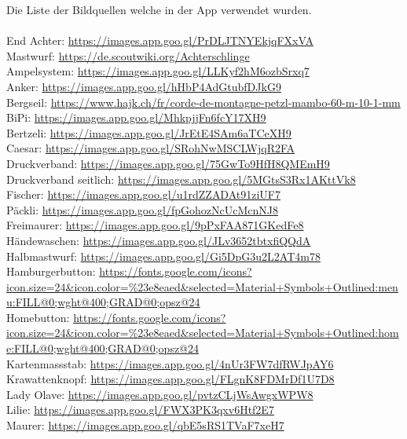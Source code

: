 Die Liste der Bildquellen welche in der App verwendet wurden.\\\\
\sloppy
\noindent
End Achter: \url{https://images.app.goo.gl/PrDLJTNYEkjqFXxVA} \\
Mastwurf: \url{https://de.scoutwiki.org/Achterschlinge} \\
Ampelsystem: \url{https://images.app.goo.gl/LLKyf2hM6ozbSrxq7} \\
Anker: \url{https://images.app.goo.gl/hHbP4AdGtubfDJkG9} \\
Bergseil: \url{https://www.hajk.ch/fr/corde-de-montagne-petzl-mambo-60-m-10-1-mm} \\
BiPi: \url{https://images.app.goo.gl/MhkpjjFn6fcY17XH9} \\
Bertzeli: \url{https://images.app.goo.gl/JrEtE4SAm6aTCeXH9} \\
Caesar: \url{https://images.app.goo.gl/SRohNwMSCLWjqR2FA} \\
Druckverband: \url{https://images.app.goo.gl/75GwTo9HfH8QMEmH9} \\
Druckverband seitlich: \url{https://images.app.goo.gl/5MGtsS3Rx1AKttVk8} \\
Fischer: \url{https://images.app.goo.gl/u1rdZZADAt91ziUF7} \\
Päckli: \url{https://images.app.goo.gl/fpGohozNcUcMcnNJ8} \\
Freimaurer: \url{https://images.app.goo.gl/9pPxFAA871GKedFe8} \\
Händewaschen: \url{https://images.app.goo.gl/JLv3652tbtxfiQQdA} \\
Halbmastwurf: \url{https://images.app.goo.gl/Gi5DpG3u2L2AT4m78} \\
Hamburgerbutton: \url{https://fonts.google.com/icons?icon.size=24&icon.color=%23e8eaed&selected=Material+Symbols+Outlined:menu:FILL@0;wght@400;GRAD@0;opsz@24} \\
Homebutton: \url{https://fonts.google.com/icons?icon.size=24&icon.color=%23e8eaed&selected=Material+Symbols+Outlined:home:FILL@0;wght@400;GRAD@0;opsz@24} \\
Kartenmassstab: \url{https://images.app.goo.gl/4nUr3FW7dfRWJpAY6} \\
Krawattenknopf: \url{https://images.app.goo.gl/FLgnK8FDMrDf1U7D8} \\
Lady Olave: \url{https://images.app.goo.gl/pvtzCLjWsAwgxWPW8} \\
Lilie: \url{https://images.app.goo.gl/FWX3PK3qxv6Htf2E7} \\
Maurer: \url{https://images.app.goo.gl/qbE5sRS1TVaF7xeH7} \\
